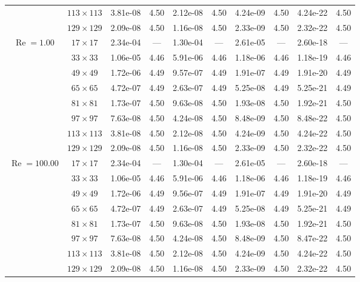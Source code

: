 \documentclass[preprint, 12pt]{elsarticle}
\begin{document}
\begin{center}
\begin{table}[H]
{\begin{tabular*}{\textwidth}{@{\extracolsep\fill}cccccccccc@{}}
    & $113\times 113$ & 3.81e-08 & 4.50 & 2.12e-08 & 4.50 & 4.24e-09 & 4.50 & 4.24e-22 & 4.50 \\
    & $129\times 129$ & 2.09e-08 & 4.50 & 1.16e-08 & 4.50 & 2.33e-09 & 4.50 & 2.32e-22 & 4.50 \\
    \hline\hline
    \multirow{7}{*}{$\operatorname{Re}=1.00$} & $17\times 17$ & 2.34e-04 & --- & 1.30e-04 & --- & 2.61e-05 & --- & 2.60e-18 & --- \\
    & $33\times 33$ & 1.06e-05 & 4.46 & 5.91e-06 & 4.46 & 1.18e-06 & 4.46 & 1.18e-19 & 4.46 \\
    & $49\times 49$ & 1.72e-06 & 4.49 & 9.57e-07 & 4.49 & 1.91e-07 & 4.49 & 1.91e-20 & 4.49 \\
    \multirow{3}{*}{$\operatorname{Wi}=10$} & $65\times 65$ & 4.72e-07 & 4.49 & 2.63e-07 & 4.49 & 5.25e-08 & 4.49 & 5.25e-21 & 4.49 \\
    & $81\times 81$ & 1.73e-07 & 4.50 & 9.63e-08 & 4.50 & 1.93e-08 & 4.50 & 1.92e-21 & 4.50 \\
    & $97\times 97$ & 7.63e-08 & 4.50 & 4.24e-08 & 4.50 & 8.48e-09 & 4.50 & 8.48e-22 & 4.50 \\
    & $113\times 113$ & 3.81e-08 & 4.50 & 2.12e-08 & 4.50 & 4.24e-09 & 4.50 & 4.24e-22 & 4.50 \\
    & $129\times 129$ & 2.09e-08 & 4.50 & 1.16e-08 & 4.50 & 2.33e-09 & 4.50 & 2.32e-22 & 4.50 \\
    \hline
    \multirow{7}{*}{$\operatorname{Re}=100.00$} & $17\times 17$ & 2.34e-04 & --- & 1.30e-04 & --- & 2.61e-05 & --- & 2.60e-18 & --- \\
    & $33\times 33$ & 1.06e-05 & 4.46 & 5.91e-06 & 4.46 & 1.18e-06 & 4.46 & 1.18e-19 & 4.46 \\
    & $49\times 49$ & 1.72e-06 & 4.49 & 9.56e-07 & 4.49 & 1.91e-07 & 4.49 & 1.91e-20 & 4.49 \\
    \multirow{3}{*}{$\operatorname{Wi}=10$} & $65\times 65$ & 4.72e-07 & 4.49 & 2.63e-07 & 4.49 & 5.25e-08 & 4.49 & 5.25e-21 & 4.49 \\
    & $81\times 81$ & 1.73e-07 & 4.50 & 9.63e-08 & 4.50 & 1.93e-08 & 4.50 & 1.92e-21 & 4.50 \\
    & $97\times 97$ & 7.63e-08 & 4.50 & 4.24e-08 & 4.50 & 8.48e-09 & 4.50 & 8.47e-22 & 4.50 \\
    & $113\times 113$ & 3.81e-08 & 4.50 & 2.12e-08 & 4.50 & 4.24e-09 & 4.50 & 4.24e-22 & 4.50 \\
    & $129\times 129$ & 2.09e-08 & 4.50 & 1.16e-08 & 4.50 & 2.33e-09 & 4.50 & 2.32e-22 & 4.50 \\

\end{tabular*}}
\end{table}
\end{center}
\end{document}
